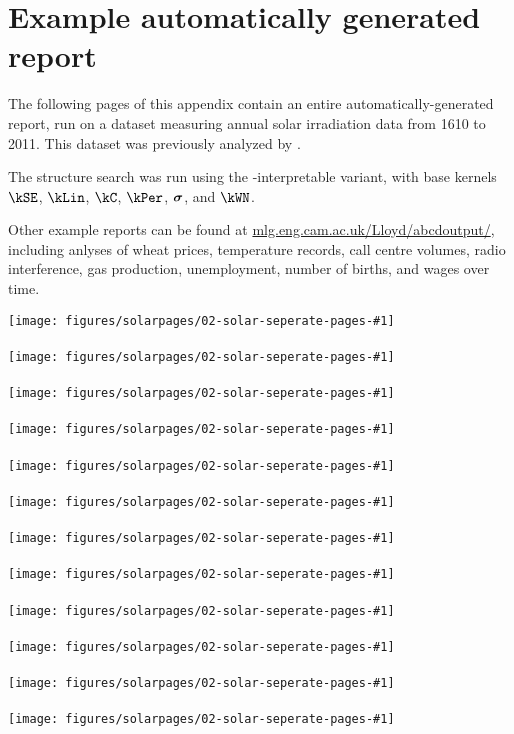 \chapter{Example automatically generated report}
\label{ch:example-solar}

The following pages of this appendix contain an entire automatically-generated report, run on a dataset measuring annual solar irradiation data from 1610 to 2011.
This dataset was previously analyzed by \citet{lean1995reconstruction}.

The structure search was run using the \procedurename-interpretable variant, with base kernels $\kSE$, $\kLin$, $\kC$, $\kPer$, ${\boldsymbol{\sigma}}$, and $\kWN$.

Other example reports can be found at \url{mlg.eng.cam.ac.uk/Lloyd/abcdoutput/}, including anlyses of wheat prices, temperature records, call centre volumes, radio interference, gas production, unemployment, number of births, and wages over time.

\newcommand{\solarreportpage}[1]{\texttt{[image: figures/solarpages/02-solar-seperate-pages-\#1]}}

\clearpage


\solarreportpage{2}
\\ \vspace{1cm} \\
\solarreportpage{3}
\\ \vspace{1cm} \\
\solarreportpage{4}
\\ \vspace{1cm} \\
\solarreportpage{5}
\\ \vspace{1cm} \\
\solarreportpage{6}
\\ \vspace{1cm} \\
\solarreportpage{7}
\\ \vspace{1cm} \\
\solarreportpage{8}
\\ \vspace{1cm} \\
\solarreportpage{9}
\\ \vspace{1cm} \\
\solarreportpage{10}
\\ \vspace{1cm} \\
\solarreportpage{11}
\\ \vspace{1cm} \\
\solarreportpage{12}
\\ \vspace{1cm} \\
\solarreportpage{13}

